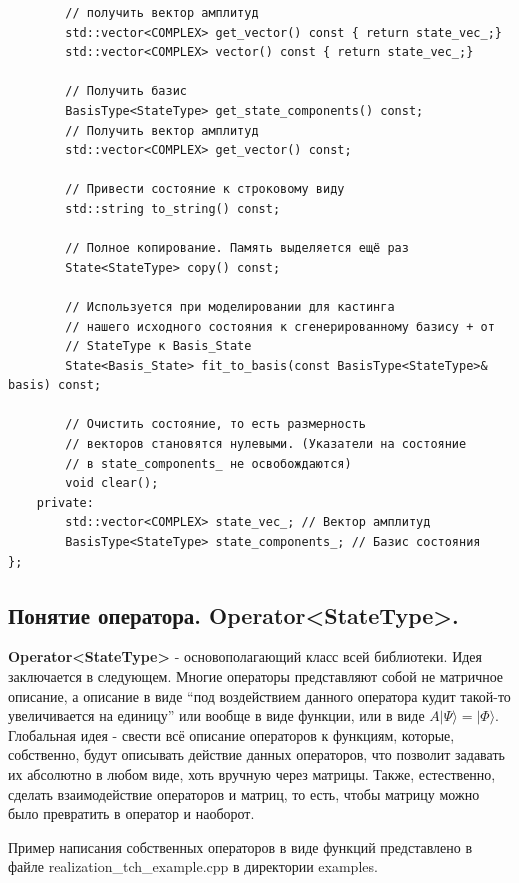 \documentclass[12pt,fleqn]{article}
\begin{document}
\begin{mdframed}[linecolor=black, topline=true, bottomline=true,
    leftline=false, rightline=false]
\begin{verbatim}
        // получить вектор амплитуд
        std::vector<COMPLEX> get_vector() const { return state_vec_;}
        std::vector<COMPLEX> vector() const { return state_vec_;}

        // Получить базис
        BasisType<StateType> get_state_components() const;
        // Получить вектор амплитуд
        std::vector<COMPLEX> get_vector() const;

        // Привести состояние к строковому виду
        std::string to_string() const;

        // Полное копирование. Память выделяется ещё раз
        State<StateType> copy() const;

        // Используется при моделировании для кастинга
        // нашего исходного состояния к сгенерированному базису + от
        // StateType к Basis_State
        State<Basis_State> fit_to_basis(const BasisType<StateType>& basis) const;

        // Очистить состояние, то есть размерность 
        // векторов становятся нулевыми. (Указатели на состояние 
        // в state_components_ не освобождаются)
        void clear();
    private:
        std::vector<COMPLEX> state_vec_; // Вектор амплитуд
        BasisType<StateType> state_components_; // Базис состояния
};
\end{verbatim}
\end{mdframed}

        \subsection{Понятие оператора. \textbf{Operator<StateType>}.}
        \textbf{Operator<StateType>} - основополагающий класс всей библиотеки. Идея заключается в следующем.
        Многие операторы представляют собой не матричное описание, а описание в виде ``под воздействием данного оператора кудит такой-то увеличивается на единицу''
         или вообще в виде функции, или в виде $A|\Psi\rangle = |\Phi\rangle$. 
        Глобальная идея - свести всё описание операторов к функциям, которые, собственно, будут описывать действие данных операторов, что позволит задавать их абсолютно в любом виде, 
        хоть вручную через матрицы. 
        Также, естественно, сделать взаимодействие операторов и матриц, то есть, чтобы матрицу можно было превратить в оператор и наоборот.

        Пример написания собственных операторов в виде функций представлено в файле \textsf{realization\_tch\_example.cpp} в директории \textsf{examples}.
\end{document}
